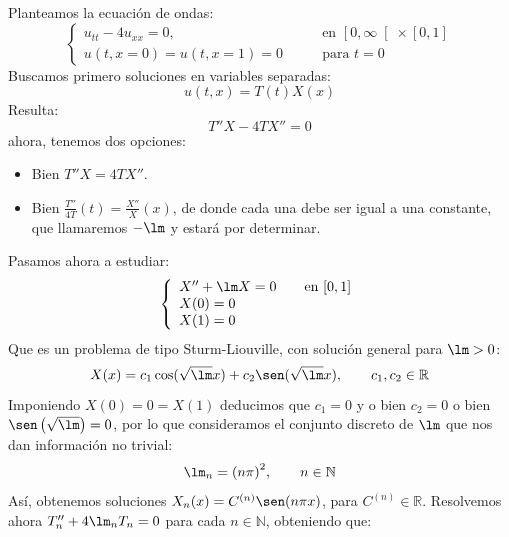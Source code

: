 \begin{ejemplo}
    \noindent
    Planteamos la ecuación de ondas:
    \begin{equation*}
        \left\{\begin{array}{ll}
                u_{tt} - 4u_{xx} = 0, &\text{en\ } \left[0,\infty\right[\times [0,1] \\
                    u(t,x=0) = u(t,x=1)=0 \qquad &\text{para\ } t=0
        \end{array}\right.
    \end{equation*}
    Buscamos primero soluciones en variables separadas:
    \begin{equation*}
        u(t,x) = T(t)X(x)
    \end{equation*}
    Resulta:
    \begin{equation*}
        T''X - 4TX'' = 0
    \end{equation*}
    ahora, tenemos dos opciones:
    \begin{itemize}
        \item Bien $T''X = 4TX''$.
        \item Bien $\frac{T''}{4T}(t) = \frac{X''}{X}(x)$, de donde cada una debe ser igual a una constante, que llamaremos $-\lm$ y estará por determinar.
    \end{itemize}
    Pasamos ahora a estudiar:
    \begin{equation*}
        \left\{\begin{array}{l}
            X'' + \lm X = 0 \qquad \text{en\ } [0,1] \\
            X(0) = 0  \\
            X(1) = 0 
        \end{array}\right.
    \end{equation*}
    Que es un problema de tipo Sturm-Liouville, con solución general para $\lm>0$:
    \begin{equation*}
        X(x) = c_1\cos(\sqrt{\lm}x) + c_2\sen(\sqrt{\lm}x), \qquad c_1,c_2\in \mathbb{R}
    \end{equation*}
    Imponiendo $X(0) = 0 = X(1)$ deducimos que $c_1 = 0$ y o bien $c_2=0$ o bien $\sen\left(\sqrt{\lm}\right)=0$, por lo que consideramos el conjunto discreto de $\lm$ que nos dan información no trivial:
    \begin{equation*}
        \lm_n = {(n\pi)}^{2}, \qquad n\in \mathbb{N}
    \end{equation*}
    Así, obtenemos soluciones $X_n(x) = C^{(n)}\sen(n\pi x)$, para $C^{(n)}\in \mathbb{R}$. Resolvemos ahora $T_n'' + 4\lm_nT_n = 0$ para cada $n\in \mathbb{N}$, obteniendo que:

\end{ejemplo}
